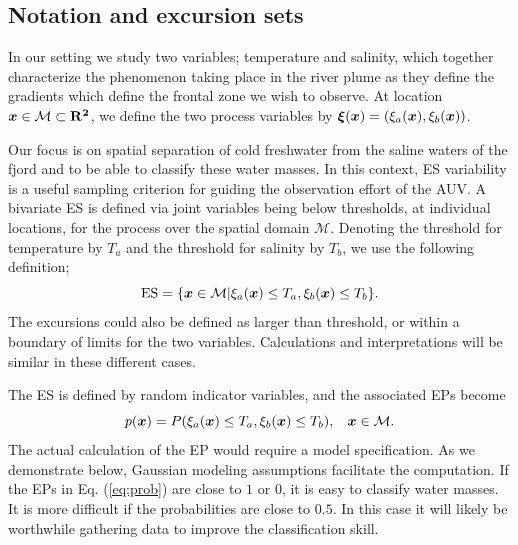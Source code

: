 \documentclass[aoas]{imsart}
\begin{document}


\subsection{Notation and excursion sets}

In our setting we study two variables; temperature and salinity, which
together characterize the phenomenon taking place in the river plume as
they define the gradients which define the frontal zone we wish to
observe. At location ${\boldsymbol x} \in \mathcal{M} \subset \mathbf{R^2}$, we
define the two process variables by
${\boldsymbol \xi}({\boldsymbol x})=(\xi_a({\boldsymbol x}),\xi_b({\boldsymbol x}))$. %

Our focus is on spatial separation of cold freshwater from the saline
waters of the fjord and to be able to classify these water masses. In
this context, ES variability is a useful sampling criterion for guiding
the observation effort of the AUV. A bivariate ES is defined via joint
variables being below thresholds, at individual locations, for the
process over the spatial domain $\mathcal{M}$. Denoting the threshold
for temperature by $T_a$ and the threshold for salinity by $T_b$, we use
the following definition;
 \begin{equation}\label{ES}
     \mbox{ES} = \{\bx \in \mathcal{M} | \xi_a(\bx) \leq T_a,\xi_b(\bx) \leq T_b\}.
 \end{equation}
The excursions could also be defined as larger than threshold, or within a boundary of limits for the two variables. Calculations and interpretations will be similar in these different cases. 

The ES is defined by random indicator variables, and the associated EPs become 
\begin{equation}\label{eq:prob}
 p(\bx) = P(\xi_a(\bx) \leq T_a, \xi_b(\bx) \leq T_b), \hspace{3mm} \bx \in \mathcal{M}.
\end{equation}
The actual calculation of the EP would require a model specification. As we demonstrate below, Gaussian modeling assumptions facilitate the computation. 
If the EPs in Eq. (\ref{eq:prob}) are close to $1$ or $0$, it is easy to classify water masses. It is more difficult if the probabilities are close to $0.5$. In this case it will likely be worthwhile gathering data to improve the classification skill. 
\end{document}
